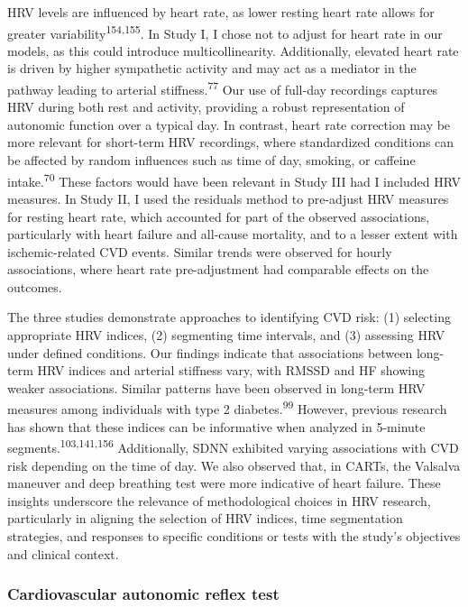\documentclass[
  letterpaper,
  headsepline=true,
  open=any]{scrbook}
\begin{document}
HRV levels are influenced by heart rate, as lower resting heart rate
allows for greater variability\textsuperscript{154,155}. In Study I, I
chose not to adjust for heart rate in our models, as this could
introduce multicollinearity. Additionally, elevated heart rate is driven
by higher sympathetic activity and may act as a mediator in the pathway
leading to arterial stiffness.\textsuperscript{77} Our use of full-day
recordings captures HRV during both rest and activity, providing a
robust representation of autonomic function over a typical day. In
contrast, heart rate correction may be more relevant for short-term HRV
recordings, where standardized conditions can be affected by random
influences such as time of day, smoking, or caffeine
intake.\textsuperscript{70} These factors would have been relevant in
Study III had I included HRV measures. In Study II, I used the residuals
method to pre-adjust HRV measures for resting heart rate, which
accounted for part of the observed associations, particularly with heart
failure and all-cause mortality, and to a lesser extent with
ischemic-related CVD events. Similar trends were observed for hourly
associations, where heart rate pre-adjustment had comparable effects on
the outcomes.

The three studies demonstrate approaches to identifying CVD risk: (1)
selecting appropriate HRV indices, (2) segmenting time intervals, and
(3) assessing HRV under defined conditions. Our findings indicate that
associations between long-term HRV indices and arterial stiffness vary,
with RMSSD and HF showing weaker associations. Similar patterns have
been observed in long-term HRV measures among individuals with type 2
diabetes.\textsuperscript{99} However, previous research has shown that
these indices can be informative when analyzed in 5-minute
segments.\textsuperscript{103,141,156} Additionally, SDNN exhibited
varying associations with CVD risk depending on the time of day. We also
observed that, in CARTs, the Valsalva maneuver and deep breathing test
were more indicative of heart failure. These insights underscore the
relevance of methodological choices in HRV research, particularly in
aligning the selection of HRV indices, time segmentation strategies, and
responses to specific conditions or tests with the study's objectives
and clinical context.

\hypertarget{cardiovascular-autonomic-reflex-test}{%
\subsubsection{Cardiovascular autonomic reflex
test}\label{cardiovascular-autonomic-reflex-test}}
\end{document}
